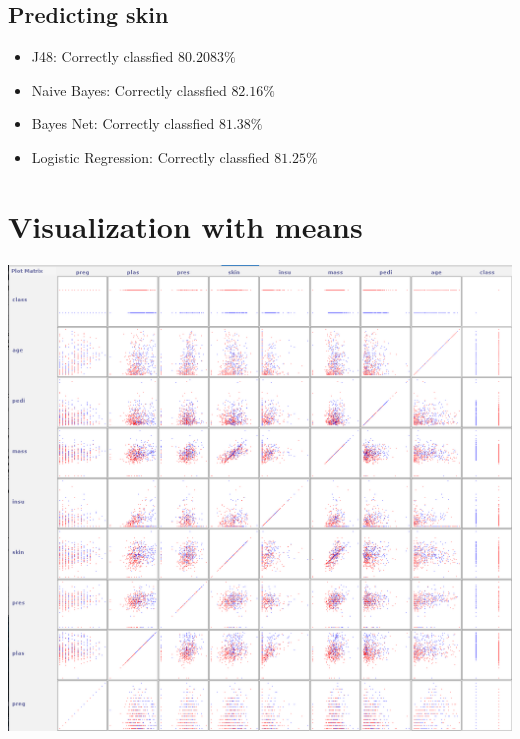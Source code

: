 \documentclass{article}
\begin{document}
\subsection{\small{Predicting skin }}
\begin{itemize}
\item J48: Correctly classfied $80.2083 \%$
\item Naive Bayes: Correctly classfied $82.16 \%$
\item Bayes Net: Correctly classfied $81.38 \%$
\item Logistic Regression: Correctly classfied $81.25 \%$
\end{itemize}

\section{\small{Visualization with means}}
\includegraphics[width=\textwidth]{Regressed_diabetes}
\end{document}
